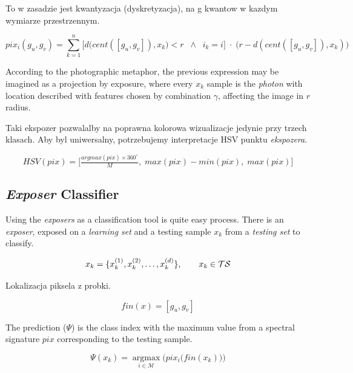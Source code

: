 \documentclass[]{article}
\begin{document}
To w zasadzie jest kwantyzacja (dyskretyzacja), na g kwantow w kazdym wymiarze przestrzennym.

\begin{equation}
	pix_i(g_u,g_v) = \sum_{k=1}^{n}\Big[d\Big(cent([g_u,g_v]),x_k\Big) < r \;\;\wedge\;\; i_k = i\Big]\;\cdot\; \Big(r - d(cent([g_u,g_v]),x_k)\Big)
\end{equation}

According to the photographic metaphor, the previous expression may be imagined as a projection by exposure, where every $x_k$ sample is the \emph{photon} with location described with features chosen by combination $\gamma$, affecting the image in $r$ radius.

Taki ekspozer pozwalalby na poprawna kolorowa wizualizacje jedynie przy trzech klasach. Aby byl uniwersalny, potrzebujemy interpretacje HSV punktu \emph{ekspozera}.

\begin{equation}
	HSV(pix) = \Big[\tfrac{argmax(pix) \times 360^\circ}{M},\;max(pix) - min(pix),\;max(pix)\Big] 
\end{equation}


\subsection{\emph{Exposer} Classifier}
\label{exposerclassifier}

Using the \emph{exposers} as a classification tool is quite easy process. There is an \emph{exposer}, exposed on a \emph{learning set} and a testing sample $x_k$ from a \emph{testing set} to classify.

\begin{equation}
	\begin{array}[b]{l}
		x_k=\{x_k^{(1)}, x_k^{(2)}, \ldots, x_k^{(d)}\},\quad\quad x_k \in \mathcal{TS}
	\end{array}
\end{equation}

Lokalizacja piksela z probki.

\begin{equation}
	fin(x) = [g_u,g_v]
\end{equation}

The prediction ($\Psi$) is the class index with the maximum value from a spectral signature $pix$ corresponding to the testing sample.

\begin{equation}
	\Psi(x_k) = \mathop{argmax}\limits_{i \in \mathcal{M}}\Bigg(pix_i\Big(fin(x_k)\Big)\Bigg)
\end{equation}
\end{document}
